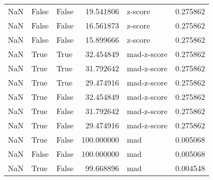\begin{table}[htp]
\begin{tabular}{rllrlr}
         NaN &          False &       False &  19.541806 &     z-score &  0.275862 \\
         NaN &          False &       False &  16.561873 &     z-score &  0.275862 \\
         NaN &          False &       False &  15.899666 &     z-score &  0.275862 \\
         NaN &           True &        True &  32.454849 & mad-z-score &  0.275862 \\
         NaN &           True &        True &  31.792642 & mad-z-score &  0.275862 \\
         NaN &           True &        True &  29.474916 & mad-z-score &  0.275862 \\
         NaN &           True &       False &  32.454849 & mad-z-score &  0.275862 \\
         NaN &           True &       False &  31.792642 & mad-z-score &  0.275862 \\
         NaN &           True &       False &  29.474916 & mad-z-score &  0.275862 \\
         NaN &           True &       False & 100.000000 &         mad &  0.005068 \\
         NaN &          False &       False & 100.000000 &         mad &  0.005068 \\
         NaN &           True &       False &  99.668896 &         mad &  0.004548 \\
\bottomrule
\end{tabular}
\end{table}

